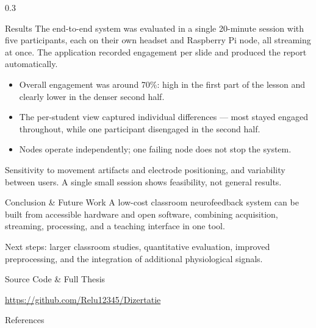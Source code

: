 \documentclass[final]{beamer}
\begin{document}
\begin{frame}[fragile]
\begin{columns}[t]
\separatorcolumn

\begin{column}{0.3\paperwidth}

\begin{exampleblock}{Results}
    The end-to-end system was evaluated in a single 20-minute session with five
    participants, each on their own headset and Raspberry Pi node, all streaming
    at once. The application recorded engagement per slide and produced the
    report automatically.
    \begin{itemize}
        \item Overall engagement was around 70\%: high in the first part of the
            lesson and clearly lower in the denser second half.
        \item The per-student view captured individual differences --- most
            stayed engaged throughout, while one participant disengaged in the
            second half.
        \item Nodes operate independently; one failing node does not stop the
            system.
    \end{itemize}

    \bigskip
    Sensitivity to movement artifacts and electrode positioning, and variability
    between users. A single small session shows feasibility, not general results.
\end{exampleblock}

\begin{alertblock}{Conclusion \& Future Work}
    A low-cost classroom neurofeedback system can be built from accessible
    hardware and open software, combining acquisition, streaming, processing, and
    a teaching interface in one tool.

    \bigskip
    Next steps: larger classroom studies, quantitative evaluation, improved
    preprocessing, and the integration of additional physiological signals.
\end{alertblock}

\begin{block}{Source Code \& Full Thesis}
    \centering

    \medskip
    \url{https://github.com/Relu12345/Dizertatie}
\end{block}

\begin{alertblock}{References}
    \nocite{*}
    
    
\end{alertblock}

\end{column}
\separatorcolumn
\end{columns}
\end{frame}
\end{document}
